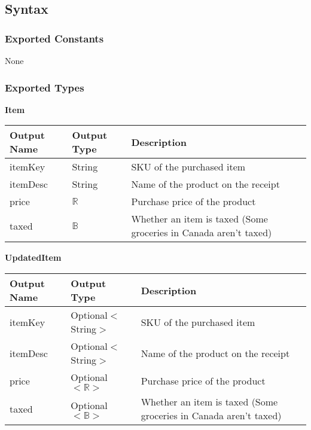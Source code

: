 \documentclass[12pt, titlepage]{article}
\begin{document}
\subsection{Syntax}

\subsubsection{Exported Constants}

None

\subsubsection{Exported Types}

\textbf{Item}

\begin{table}[H]
  \begin{tabular}{|p{}|p{}|p{}|}
    \hline
    \textbf{Output Name} & \textbf{Output Type} & \textbf{Description} \\
    \hline
    itemKey & String & SKU of the purchased item \\
    \hline
    itemDesc & String & Name of the product on the receipt \\
    \hline
    price & $\mathbb{R}$ & Purchase price of the product \\
    \hline
    taxed & $\mathbb{B}$ & Whether an item is taxed (Some groceries in Canada aren't taxed) \\
    \hline
  \end{tabular}
\end{table}

\textbf{UpdatedItem}

\begin{table}[H]
  \begin{tabular}{|p{}|p{}|p{}|}
    \hline
    \textbf{Output Name} & \textbf{Output Type} & \textbf{Description} \\
    \hline
    itemKey & Optional$<$String$>$ & SKU of the purchased item \\
    \hline
    itemDesc & Optional$<$String$>$ & Name of the product on the receipt \\
    \hline
    price & Optional$<\mathbb{R}>$ & Purchase price of the product \\
    \hline
    taxed & Optional$<\mathbb{B}>$ & Whether an item is taxed (Some groceries in Canada aren't taxed) \\
    \hline
  \end{tabular}
\end{table}
\end{document}
